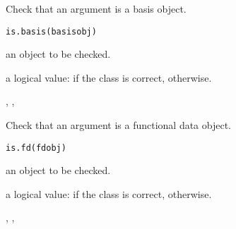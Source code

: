 \documentclass{article}
\begin{document}
\begin{Description}\relax
Check that an argument is a basis object.
\end{Description}
\begin{Usage}
\begin{verbatim}
is.basis(basisobj)
\end{verbatim}
\end{Usage}
\begin{Arguments}
\begin{ldescription}
\item[\code{basisobj}] an object to be checked.

\end{ldescription}
\end{Arguments}
\begin{Value}
a logical value:
 if the class is correct,  otherwise.
\end{Value}
\begin{SeeAlso}\relax
{}, 
, 
\end{SeeAlso}

\begin{Description}\relax
Check that an argument is a functional data object.
\end{Description}
\begin{Usage}
\begin{verbatim}
is.fd(fdobj)
\end{verbatim}
\end{Usage}
\begin{Arguments}
\begin{ldescription}
\item[\code{fdobj}] an object to be checked.

\end{ldescription}
\end{Arguments}
\begin{Value}
a logical value:
 if the class is correct,  otherwise.
\end{Value}
\begin{SeeAlso}\relax
{}, 
, 
\end{SeeAlso}
\end{document}

